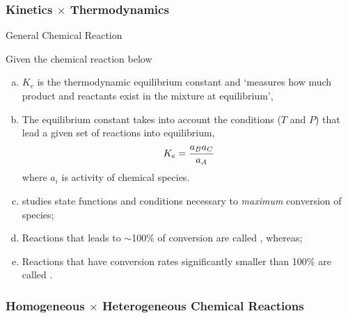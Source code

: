 \documentclass[10pt,compress,unknownkeysallowed]{beamer}
\begin{document}
\begin{frame}
  \frametitle{Kinetics $\times$ Thermodynamics}

  \begin{block}{\begin{center}General Chemical Reaction\end{center}}
     Given the chemical reaction below
  \end{block}  

   \begin{enumerate}[a)]
       \item<1-> $K_{e}$ is the thermodynamic equilibrium constant and `measures how much product and reactants exist in the mixture at equilibrium',
       \item<1-> The equilibrium constant takes into account the conditions ($T$ and $P$) that lead a given set of reactions into equilibrium, \eg
             \begin{displaymath}
                  K_{e} = \displaystyle\frac{a_{B}a_{C}}{a_{A}}
             \end{displaymath}
             where $a_{i}$ is activity of  chemical species. 
       \item<1->  studies state functions and conditions necessary to {\it maximum} conversion of species;
       \item<1-> Reactions that leads to $\sim$100$\%$ of conversion are called , whereas;
       \item<1-> Reactions that have conversion rates significantly smaller than 100$\%$ are called .
   \end{enumerate}
\end{frame}
\normalsize

\begin{frame}
  \frametitle{Homogeneous $\times$ Heterogeneous Chemical Reactions}

\end{frame}
\normalsize
\end{document}
